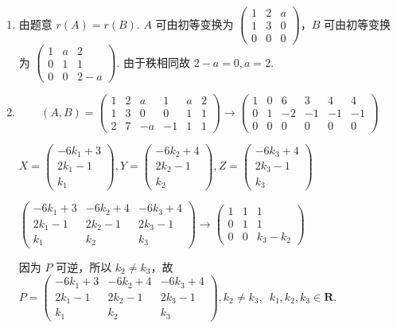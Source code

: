 \documentclass[12pt,fontset=fandol]{ctexart}
\begin{document}
\begin{solve}
\begin{enumerate}
                \item 由题意 $r(A)=r(B)$. $A$ 可由初等变换为 $\begin{pmatrix}1 & 2 & a \\ 1 & 3 & 0 \\ 0 & 0 & 0\end{pmatrix}$，$B$ 可由初等变换为 $\begin{pmatrix}1 & a & 2 \\ 0 & 1 & 1 \\ 0 & 0 & 2-a\end{pmatrix}$. 由于秩相同故 $2-a=0,a=2$.

                \item 
\[(A,B)=\begin{pmatrix}1 & 2 & a & 1 & a & 2 \\ 1 & 3 & 0 & 0 & 1 & 1 \\ 2 & 7 & -a & -1 & 1 & 1\end{pmatrix}\rightarrow\begin{pmatrix}1 & 0 & 6 & 3 & 4 & 4 \\ 0 & 1 & -2 & -1 & -1 & -1 \\ 0 & 0 & 0 & 0 & 0 & 0\end{pmatrix}\]


                        $X = \begin{pmatrix}-6k_1+3 \\ 2k_1-1 \\ k_1\end{pmatrix},Y = \begin{pmatrix}-6k_2+4 \\ 2k_2-1 \\ k_2\end{pmatrix},Z = \begin{pmatrix}-6k_3+4 \\ 2k_3-1 \\ k_3\end{pmatrix}$

                        $\begin{pmatrix}-6k_1+3 & -6k_2+4 & -6k_3+4 \\ 2k_1-1 & 2k_2-1 & 2k_3-1 \\ k_1 & k_2 & k_3\end{pmatrix}\rightarrow \begin{pmatrix}1 & 1 & 1 \\ 0 & 1 & 1 \\ 0 & 0 & k_3-k_2\end{pmatrix}$

                        因为 $P$ 可逆，所以 $k_2\neq k_3$，故 $P=\begin{pmatrix}-6k_1+3 & -6k_2+4 & -6k_3+4 \\ 2k_1-1 & 2k_2-1 & 2k_3-1 \\ k_1 & k_2 & k_3\end{pmatrix},k_2\neq k_3,\enspace k_1,k_2,k_3 \in \mathbf{R}$.
            \end{enumerate}
\end{solve}
\end{document}

